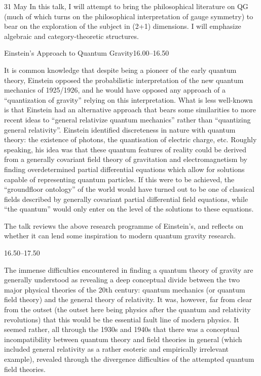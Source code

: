 \documentclass{conference}
\begin{document}
\begin{Day}{31 May}
  {In this talk, I will attempt to bring the philosophical literature on QG (much of which turns on the philosophical interpretation of gauge symmetry) to bear on the exploration of the subject in (2+1) dimensions. I will emphasize algebraic and category-theoretic structures.}



    {Einstein's Approach to Quantum Gravity}{16.00--16.50}
    {It is common knowledge that despite being a pioneer of the early quantum theory, Einstein opposed the probabilistic interpretation of the new quantum mechanics of 1925/1926, and he would have opposed any approach of a “quantization of gravity” relying on this interpretation. What is less well-known is that Einstein had an alternative approach that bears some similarities to more recent ideas to “general relativize quantum mechanics” rather than “quantizing general relativity”. Einstein identified discreteness in nature with quantum theory: the existence of photons, the quantisation of electric charge, etc. Roughly speaking, his idea was that these quantum features of reality could be derived from a generally covariant field theory of gravitation and electromagnetism by finding overdetermined partial differential equations which allow for solutions capable of representing quantum particles. If this were to be achieved, the “groundfloor ontology” of the world would have turned out to be one of classical fields described by generally covariant partial differential field equations, while “the quantum” would only enter on the level of the solutions to these equations.

The talk reviews the above research programme of Einstein’s, and reflects on whether it can lend some inspiration to modern quantum gravity research.}

    {16.50--17.50}
    {The immense difficulties encountered in finding a quantum theory of gravity are generally understood as revealing a deep conceptual divide between the two major physical theories of the 20th century: quantum mechanics (or quantum field theory) and the general theory of relativity.
It was, however, far from clear from the outset (the outset here being physics after the quantum and relativity revolutions) that this would be the essential fault line of modern physics. It seemed rather, all through the 1930s and 1940s that there was a conceptual incompatibility between quantum theory and field theories in general (which included general relativity as a rather esoteric and empirically irrelevant example), revealed through the divergence difficulties of the attempted quantum field theories.

}
\end{Day}
\end{document}
